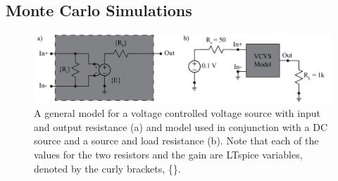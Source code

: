 \subsection{Monte Carlo Simulations} \label{ssec:4MonteCarlo}

\begin{figure} [h]
	\centering
		\includegraphics[width=1\textwidth]{Lab4Agenmodel.pdf}
	\caption{A general model for a voltage controlled voltage source with input and output resistance (a) and model used in conjunction with a DC source and a source and load resistance (b). Note that each of the values for the two resistors and the gain are LTspice variables, denoted by the curly brackets, \{\}.} \label{fig:4genmod}
\end{figure}

